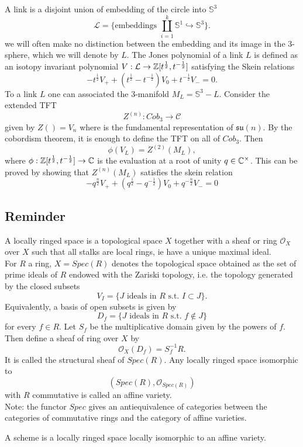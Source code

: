 A link is a disjoint union of embedding of the circle into $\mathbb S^3$
\[\mathcal L = \{ \text{embeddings }\coprod_{i=1}^k \mathbb S^1 \hookrightarrow \mathbb S^3 \}.\]
we will often make no distinction between the embedding and its image in the $3$-sphere, which we will denote by $L$. The Jones polynomial of a link $L$ is defined as an isotopy invariant polynomial $V : \mathcal L \rightarrow \mathbb Z [t^{\frac{1}{2}},t^{-\frac{1}{2}}]$ satisfying the Skein relations
\[-t^{\frac{1}{2}} V_+ + (t^{\frac{1}{2}} - t^{-\frac{1}{2}})V_0 + t^{-\frac{1}{2}}V_- = 0.\]
To a link $L$ one can associated the $3$-manifold $M_L= \mathbb S^3 - L$. Consider the extended TFT 
\[ Z^{(n)} : Cob_{3} \rightarrow \mathcal C\] given by $Z()=V_n$ where is the fundamental representation of $\mathfrak{su}(n)$. By the cobordism theorem, it is enough to define the TFT on all of $Cob_3$. Then
\[ \phi(V_L) = Z^{(2)}(M_L),\]
where $\phi : \mathbb Z [t^{\frac{1}{2}},t^{-\frac{1}{2}}] \rightarrow \mathbb C$ is the evaluation at a root of unity $q\in \mathbb C^\times$. This can be proved by showing that $Z^{(n)}(M_L)$ satisfies the skein relation \[-q^{\frac{n}{2}} V_+ + (q^{\frac{1}{2}} - q^{-\frac{1}{2}})V_0 + q^{-\frac{n}{2}}V_- = 0\]

\subsection{Reminder}

A locally ringed space is a topological space $X$ together with a sheaf or ring $\mathcal O_X$ over $X$ such that all stalks are local rings, ie have a unique maximal ideal.\\

For $R$ a ring, $X=Spec(R)$ denotes the topological space obtained as the set of prime ideals of $R$ endowed with the Zariski topology, i.e. the topology generated by the closed subsets
\[V_I = \{J \text{ ideals in } R \text{ s.t. } I \subset J \}.\]
Equivalently, a basis of open subsets is given by \[D_f = \{ J \text{ ideals in } R \text{ s.t. } f\notin J  \}\]
for every $f\in R$. Let $S_f$ be the multiplicative domain given by the powers of $f$. Then define a sheaf of ring over $X$ by
\[\mathcal O_X(D_f)   = S_f^{-1}R.\]
It is called the structural sheaf of $Spec(R)$. Any locally ringed space isomorphic to 
\[(Spec(R),\mathcal O_{Spec(R)})\] 
with $R$ commutative is called an affine variety.\\

Note: the functor $Spec$ gives an antiequivalence of categories between the categories of commutative rings and the category of affine varieties. 

\begin{definition}
A scheme is a locally ringed space locally isomorphic to an affine variety.
\end{definition}

